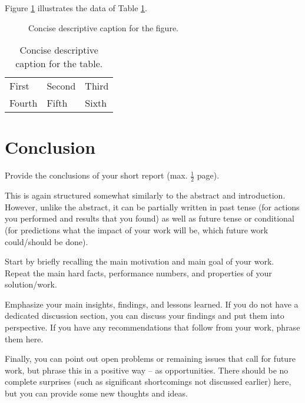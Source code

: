 \documentclass[11pt,
  titlepage=false,
]{scrreprt}
\begin{document}
Figure \ref{fig:diagram} illustrates the data of Table \ref{tab:data}.

\begin{figure}[htpb]
  \centering
  \caption{Concise descriptive caption for the figure.}
  \label{fig:diagram}
\end{figure}

\begin{table}
  \centering
  \begin{tabular}{lll}
    \hline
    First  & Second & Third \\
    Fourth & Fifth  & Sixth \\
    \hline
  \end{tabular}
  \caption{Concise descriptive caption for the table.}
  \label{tab:data}
\end{table}



\chapter{Conclusion}
\label{chap:conclusion}

Provide the conclusions of your short report (max. $\frac{1}{2}$ page).

This is again structured somewhat similarly to the abstract and introduction.
However, unlike the abstract, it can be partially written in past tense (for actions you performed and results that you found) as well as future tense or conditional (for predictions what the impact of your work will be, which future work could/should be done).

Start by briefly recalling the main motivation and main goal of your work.
Repeat the main hard facts, performance numbers, and properties of your solution/work.

Emphasize your main insights, findings, and lessons learned.
If you do not have a dedicated discussion section, you can discuss your findings and put them into perspective.
If you have any recommendations that follow from your work, phrase them here.

Finally, you can point out open problems or remaining issues that call for future work, but phrase this in a positive way -- as opportunities.
There should be no complete surprises (such as significant shortcomings not discussed earlier) here, but you can provide some new thoughts and ideas.



\printbibliography
\end{document}
